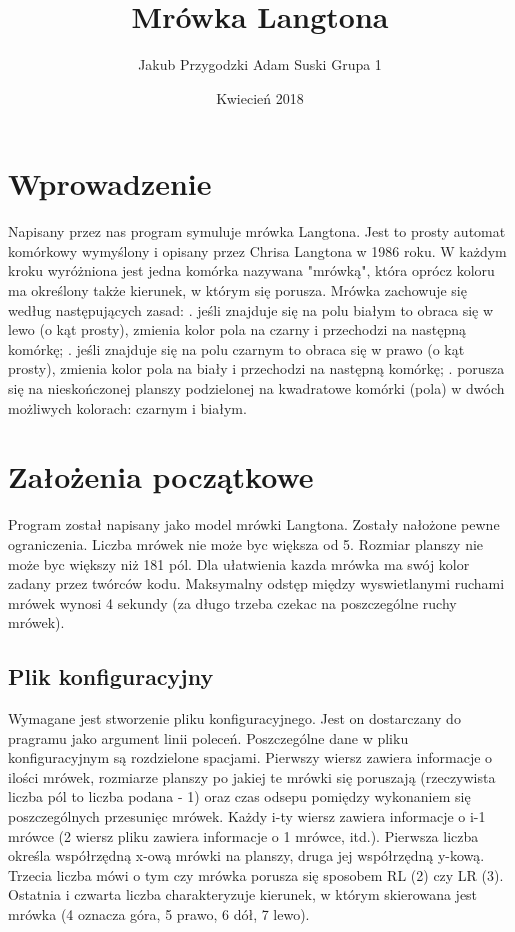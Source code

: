 \documentclass{article}
\title{Mrówka Langtona}
\author{Jakub Przygodzki Adam Suski Grupa 1}
\date{Kwiecień 2018}
\begin{document}
\maketitle
\tableofcontents 

\newpage

\section{Wprowadzenie}
Napisany przez nas program symuluje mrówka Langtona. Jest to prosty automat komórkowy wymyślony i opisany przez Chrisa Langtona w 1986 roku. W każdym kroku wyróżniona jest jedna komórka nazywana "mrówką", która oprócz koloru ma określony także kierunek, w którym się porusza. Mrówka zachowuje się według następujących zasad:
.   jeśli znajduje się na polu białym to obraca się w lewo (o kąt prosty), zmienia kolor pola na czarny i przechodzi na następną komórkę;
.  jeśli znajduje się na polu czarnym to obraca się w prawo (o kąt prosty), zmienia kolor pola na biały i przechodzi na następną komórkę; 
.  porusza się na nieskończonej planszy podzielonej na kwadratowe komórki (pola) w dwóch możliwych kolorach: czarnym i białym.

 
\section{Założenia początkowe}
Program został napisany jako model mrówki Langtona. Zostały nałożone pewne ograniczenia. 
\newline Liczba mrówek nie może byc większa od 5.
\newline Rozmiar planszy nie może byc większy niż 181 pól.
\newline Dla ułatwienia kazda mrówka ma swój kolor zadany przez twórców kodu.
\newline Maksymalny odstęp między wyswietlanymi ruchami mrówek wynosi 4 sekundy (za długo trzeba czekac na poszczególne ruchy mrówek).
\subsection{Plik konfiguracyjny}  Wymagane jest stworzenie pliku konfiguracyjnego. Jest on dostarczany do pragramu jako argument linii poleceń. Poszczególne dane w pliku konfiguracyjnym są rozdzielone spacjami.
\newline Pierwszy wiersz zawiera informacje o ilości mrówek, rozmiarze planszy po jakiej te mrówki się poruszają (rzeczywista liczba pól to liczba podana - 1) oraz czas odsepu pomiędzy wykonaniem się poszczególnych przesunięc mrówek. 
\newline Każdy i-ty wiersz zawiera informacje o i-1 mrówce (2 wiersz pliku zawiera informacje o 1 mrówce, itd.). Pierwsza liczba określa współrzędną x-ową mrówki na planszy, druga jej współrzędną y-kową. Trzecia liczba mówi o tym czy mrówka porusza się sposobem RL (2) czy LR (3). Ostatnia i czwarta liczba charakteryzuje kierunek, w którym skierowana jest mrówka (4 oznacza góra, 5 prawo, 6 dół, 7 lewo). 
\end{document}
